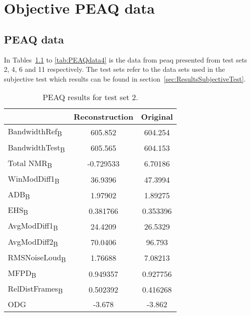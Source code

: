 \chapter{Objective PEAQ data}\label{ap:PEAQdata}
\section{PEAQ data}
In Tables~\ref{tab:PEAQdata3} to \ref{tab:PEAQdata4} is the data from \gls{peaq} \cite{BS-1387-1998} presented from test sets 2, 4, 6 and 11 respectively. The test sets refer to the data sets used in the subjective test which results can be found in section~\ref{sec:ResultsSubjectiveTest}.

\begin{table}\begin{center} %
\caption{PEAQ results for test set 2.}
\label{tab:PEAQdata3}
\begin{tabular}{|l|c|c|}
  \hline
                                    & Reconstruction & Original \\ \hline
  BandwidthRef\textsubscript{B}     & 605.852        & 604.254\\
  BandwidthTest\textsubscript{B}    & 605.565        & 604.153\\
  Total NMR\textsubscript{B}        & -0.729533      & 6.70186\\
  WinModDiff1\textsubscript{B}      & 36.9396        & 47.3994\\
  ADB\textsubscript{B}              & 1.97902        & 1.89275\\
  EHS\textsubscript{B}              & 0.381766       & 0.353396\\
  AvgModDiff1\textsubscript{B}      & 24.4209        & 26.5329\\
  AvgModDiff2\textsubscript{B}      & 70.0406        & 96.793\\
  RMSNoiseLoud\textsubscript{B}     & 1.76688        & 7.08213\\
  MFPD\textsubscript{B}             & 0.949357       & 0.927756\\
  RelDistFrames\textsubscript{B}    & 0.502392       & 0.416268\\
  ODG                               & -3.678         & -3.862\\
  \hline
\end{tabular}
\end{center}\end{table}

